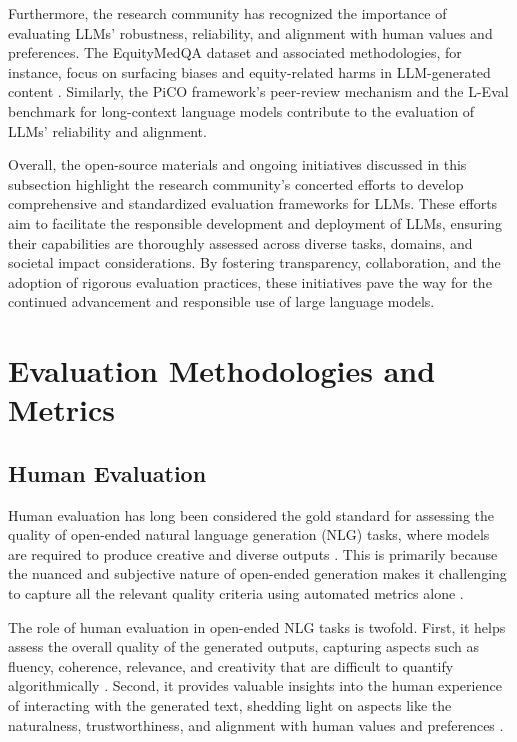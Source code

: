 \documentclass[11pt]{article}
\begin{document}
Furthermore, the research community has recognized the importance of evaluating LLMs' robustness, reliability, and alignment with human values and preferences. The EquityMedQA dataset and associated methodologies, for instance, focus on surfacing biases and equity-related harms in LLM-generated content \cite{ref81}. Similarly, the PiCO framework's peer-review mechanism and the L-Eval benchmark for long-context language models \cite{ref89} contribute to the evaluation of LLMs' reliability and alignment.

Overall, the open-source materials and ongoing initiatives discussed in this subsection highlight the research community's concerted efforts to develop comprehensive and standardized evaluation frameworks for LLMs. These efforts aim to facilitate the responsible development and deployment of LLMs, ensuring their capabilities are thoroughly assessed across diverse tasks, domains, and societal impact considerations. By fostering transparency, collaboration, and the adoption of rigorous evaluation practices, these initiatives pave the way for the continued advancement and responsible use of large language models.

\section{Evaluation Methodologies and Metrics}

\subsection{Human Evaluation}

Human evaluation has long been considered the gold standard for assessing the quality of open-ended natural language generation (NLG) tasks, where models are required to produce creative and diverse outputs \cite{ref90,ref91}. This is primarily because the nuanced and subjective nature of open-ended generation makes it challenging to capture all the relevant quality criteria using automated metrics alone \cite{ref92}.

The role of human evaluation in open-ended NLG tasks is twofold. First, it helps assess the overall quality of the generated outputs, capturing aspects such as fluency, coherence, relevance, and creativity that are difficult to quantify algorithmically \cite{ref93}. Second, it provides valuable insights into the human experience of interacting with the generated text, shedding light on aspects like the naturalness, trustworthiness, and alignment with human values and preferences \cite{ref94}.
\end{document}
